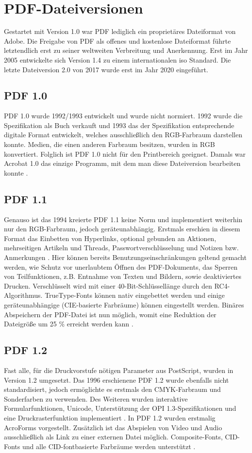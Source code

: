 \section{PDF-Dateiversionen}
Gestartet mit Version 1.0 war PDF lediglich ein proprietäres Dateiformat von Adobe. Die Freigabe von PDF als offenes und kostenlose Dateiformat führte letztendlich erst zu seiner weltweiten Verbreitung und Anerkennung. Erst im Jahr 2005 entwickelte sich Version 1.4 zu einem internationalen \gls{iso} Standard. Die letzte Dateiversion 2.0 von 2017 wurde erst im Jahr 2020 eingeführt.

\subsection{PDF 1.0}
PDF 1.0 wurde 1992/1993 entwickelt und wurde nicht normiert. 1992 wurde die Spezifikation als Buch verkauft und 1993 das der Spezifikation entsprechende digitale Format entwickelt, welches ausschließlich den RGB-Farbraum darstellen konnte. Medien, die einen anderen Farbraum besitzen, wurden in RGB konvertiert. Folglich ist PDF 1.0 nicht für den Printbereich geeignet. Damals war Acrobat 1.0 das einzige Programm, mit dem man diese Dateiversion bearbeiten konnte \cite{proj-consult}. 

\subsection{PDF 1.1}
Genauso ist das 1994 kreierte PDF 1.1 keine Norm und implementiert weiterhin nur den RGB-Farbraum, jedoch geräteunabhängig. Erstmals erschien in diesem Format das Einbetten von Hyperlinks, optional gebunden an Aktionen, mehrseitigen Artikeln und Threads, Passwortverschlüsselung und Notizen bzw. Anmerkungen \cite{proj-consult}. Hier können bereits Benutzungseinschränkungen geltend gemacht werden, wie Schutz vor unerlaubtem Öffnen des PDF-Dokuments, das Sperren von Teilfunktionen, z.B. Entnahme von Texten und Bildern, sowie deaktiviertes Drucken. Verschlüsselt wird mit einer 40-Bit-Schlüssellänge durch den RC4-Algorithmus. TrueType-Fonts können nativ eingebettet werden und einige geräteunabhängige (CIE-basierte Farbräume) können eingestellt werden. Binäres Abspeichern der PDF-Datei ist nun möglich, womit eine Reduktion der Dateigröße um 25 \% erreicht werden kann \cite{schneeberger}.

\subsection{PDF 1.2}
Fast alle, für die Druckvorstufe nötigen Parameter aus PostScript, wurden in Version 1.2 umgesetzt. Das 1996 erschienene PDF 1.2 wurde ebenfalls nicht standardisiert, jedoch ermöglichte es erstmals den CMYK-Farbraum und Sonderfarben zu verwenden. Des Weiteren wurden interaktive Formularfunktionen, Unicode, Unterstützung der OPI 1.3-Spezifikationen und eine Druckrasterfunktion implementiert \cite{proj-consult}. In PDF 1.2 wurden erstmalig AcroForms vorgestellt. Zusätzlich ist das Abspielen von Video und Audio ausschließlich als Link zu einer externen Datei möglich. Composite-Fonts, CID-Fonts und alle CID-fontbasierte Farbräume werden unterstützt \cite{schneeberger}.

